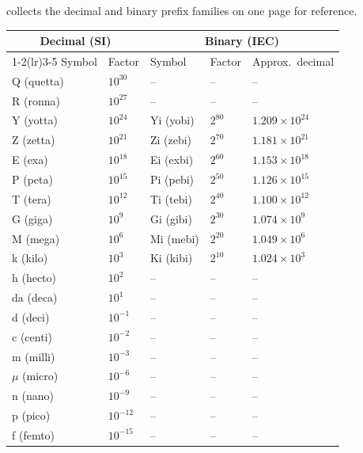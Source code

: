  collects the decimal and binary
prefix families on one page for reference.

\begin{table}[h]
\centering
\small
\begin{tabular}{lllll}
\toprule
\multicolumn{2}{c}{Decimal (SI)} & \multicolumn{3}{c}{Binary (IEC)} \\
\cmidrule(lr){1-2}\cmidrule(lr){3-5}
Symbol & Factor & Symbol & Factor & Approx.\ decimal \\
\midrule
Q (quetta) & $10^{30}$  & --      & --       & --                \\
R (ronna)  & $10^{27}$  & --      & --       & --                \\
Y (yotta)  & $10^{24}$  & Yi (yobi) & $2^{80}$ & $1.209 \times 10^{24}$ \\
Z (zetta)  & $10^{21}$  & Zi (zebi) & $2^{70}$ & $1.181 \times 10^{21}$ \\
E (exa)    & $10^{18}$  & Ei (exbi) & $2^{60}$ & $1.153 \times 10^{18}$ \\
P (peta)   & $10^{15}$  & Pi (pebi) & $2^{50}$ & $1.126 \times 10^{15}$ \\
T (tera)   & $10^{12}$  & Ti (tebi) & $2^{40}$ & $1.100 \times 10^{12}$ \\
G (giga)   & $10^{9}$   & Gi (gibi) & $2^{30}$ & $1.074 \times 10^{9}$  \\
M (mega)   & $10^{6}$   & Mi (mebi) & $2^{20}$ & $1.049 \times 10^{6}$  \\
k (kilo)   & $10^{3}$   & Ki (kibi) & $2^{10}$ & $1.024 \times 10^{3}$  \\
h (hecto)  & $10^{2}$   & --      & --       & --                \\
da (deca)  & $10^{1}$   & --      & --       & --                \\
\midrule
d (deci)   & $10^{-1}$  & --      & --       & --                \\
c (centi)  & $10^{-2}$  & --      & --       & --                \\
m (milli)  & $10^{-3}$  & --      & --       & --                \\
$\mu$ (micro) & $10^{-6}$ & --   & --       & --                \\
n (nano)   & $10^{-9}$  & --      & --       & --                \\
p (pico)   & $10^{-12}$ & --      & --       & --                \\
f (femto)  & $10^{-15}$ & --      & --       & --                \\

\end{tabular}
\end{table}
